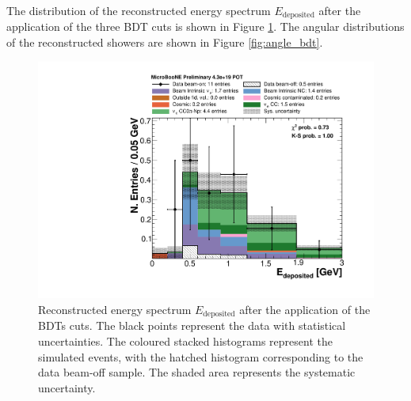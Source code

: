 The distribution of the reconstructed energy spectrum $E_{\mathrm{deposited}}$ after the application of the three BDT cuts is shown in Figure \ref{fig:reco_bdt}. The angular distributions of the reconstructed showers are shown in Figure \ref{fig:angle_bdt}. 

\begin{figure}[htbp]
\centering
  \includegraphics[width=0.75\linewidth]{figures/h_reco_energy_bdt.pdf}
  \caption{Reconstructed energy spectrum $E_{\mathrm{deposited}}$ after the application of the BDTs cuts. The black points represent the data with statistical uncertainties. The coloured stacked histograms represent the simulated events, with the hatched histogram corresponding to the data beam-off sample. The shaded area represents the systematic uncertainty.}\label{fig:reco_bdt}
\end{figure}

